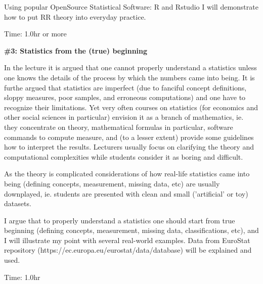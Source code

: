 \documentclass[a4page]{article}
\newcommand{\proposal}[1]{\bigskip\textbf{#1}\par\smallskip}
\begin{document}
     Using popular OpenSource Statistical Software: R and Rstudio 
     I will demonstrate how to put RR theory into everyday practice.

     Time: 1.0hr or more
     
\proposal{\#3: Statistics from the (true) beginning}

     In the lecture it is argued that one cannot properly understand a
     statistics unless one knows the details of the process by which the numbers
     came into being. It is furthe argued that statistics are
     imperfect (due to fanciful concept definitions, sloppy measures,
     poor samples, and erroneous computations) and one have to
     recognize their limitations.  Yet very often
     courses on statistics (for economics and other
     social sciences in particular) envision it as a branch of
     mathematics, ie. they concentrate on theory, mathematical
     formulas in particular, software commands to compute measure, and
     (to a lesser extent) provide some guidelines how to interpret the
     results.  Lecturers usually focus on clarifying the theory and
     computational complexities while students consider it as boring and difficult.

     As the theory is complicated considerations
     of how real-life statistics came into being (defining concepts,
     measurement, missing data, etc) are usually downplayed, ie. students are presented
     with clean and small ('artificial' or toy) datasets.
     
     I argue that  to properly understand a
     statistics one should start from true beginning (defining concepts,
     measurement, missing data, classifications, etc), and I will illustrate 
     my point with several real-world examples. Data 
     from EuroStat repository (https://ec.europa.eu/eurostat/data/database) will be explained
     and used.

     Time: 1.0hr
     
\end{document}
